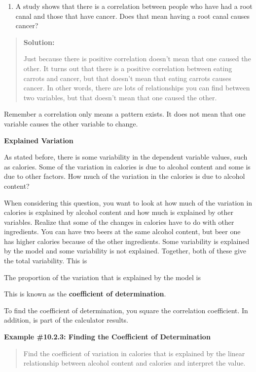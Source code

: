 \documentclass[]{book}
\providecommand{\tightlist}{%
  \setlength{\itemsep}{0pt}\setlength{\parskip}{0pt}}
\begin{document}
\begin{enumerate}
\def\labelenumi{\alph{enumi}.}
\setcounter{enumi}{1}
\tightlist
\item
  A study shows that there is a correlation between people who have had a root canal and those that have cancer. Does that mean having a root canal causes cancer?
\end{enumerate}

\begin{quote}
\textbf{Solution:}

Just because there is positive correlation doesn't mean that one caused the other. It turns out that there is a positive correlation between eating carrots and cancer, but that doesn't mean that eating carrots causes cancer. In other words, there are lots of relationships you can find between two variables, but that doesn't mean that one caused the other.
\end{quote}

Remember a correlation only means a pattern exists. It does not mean that one variable causes the other variable to change.

\textbf{Explained Variation}

As stated before, there is some variability in the dependent variable values, such as calories. Some of the variation in calories is due to alcohol content and some is due to other factors. How much of the variation in the calories is due to alcohol content?

When considering this question, you want to look at how much of the variation in calories is explained by alcohol content and how much is explained by other variables. Realize that some of the changes in calories have to do with other ingredients. You can have two beers at the same alcohol content, but beer one has higher calories because of the other ingredients. Some variability is explained by the model and some variability is not explained. Together, both of these give the total variability. This is

The proportion of the variation that is explained by the model is

This is known as the \textbf{coefficient of determination}.

To find the coefficient of determination, you square the correlation coefficient. In addition, is part of the calculator results.

\textbf{Example \#10.2.3: Finding the Coefficient of Determination}

\begin{quote}
Find the coefficient of variation in calories that is explained by the linear relationship between alcohol content and calories and interpret the value.
\end{quote}
\end{document}
